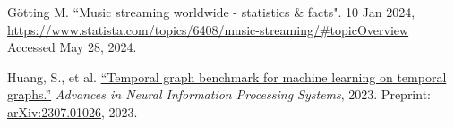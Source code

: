 \documentclass[10pt, letterpaper]{article}
\renewcommand{\section}[1]{%
	    \vspace{\parskip}
		{\large \bfseries\uppercase{#1}}
}
\begin{document}
\begingroup

\renewcommand{\section}[2]{}%

\begin{thebibliography}{3}

Götting M. 
``Music streaming worldwide - statistics \& facts". 10 Jan 2024, \url{https://www.statista.com/topics/6408/music-streaming/#topicOverview} Accessed May 28, 2024. 
	
Huang, S., et al.
\href{https://doi.org/10.48550/arXiv.2307.01026}
{``Temporal graph benchmark for machine learning on temporal graphs.''} {\em Advances in Neural Information Processing Systems}, 2023. Preprint: \url{arXiv:2307.01026}, 2023.
	
	
\end{thebibliography}

\endgroup	
	
\end{document}
